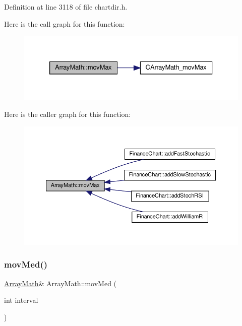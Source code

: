 Definition at line 3118 of file chartdir.\+h.

Here is the call graph for this function\+:
\nopagebreak
\begin{figure}[H]
\begin{center}
\leavevmode
\includegraphics[width=333pt]{class_array_math_a5134853d9b14c3d980036a02a4d4b043_cgraph}
\end{center}
\end{figure}
Here is the caller graph for this function\+:
\nopagebreak
\begin{figure}[H]
\begin{center}
\leavevmode
\includegraphics[width=350pt]{class_array_math_a5134853d9b14c3d980036a02a4d4b043_icgraph}
\end{center}
\end{figure}
\mbox{\label{class_array_math_a7f994291fd85c2859e7bf34c27b8013e}} 
\subsubsection{\texorpdfstring{mov\+Med()}{movMed()}}
{\footnotesize\ttfamily \hyperlink{class_array_math}{Array\+Math}\& Array\+Math\+::mov\+Med (\begin{DoxyParamCaption}\item[{int}]{interval }\end{DoxyParamCaption})\hspace{0.3cm}{\ttfamily [inline]}}



